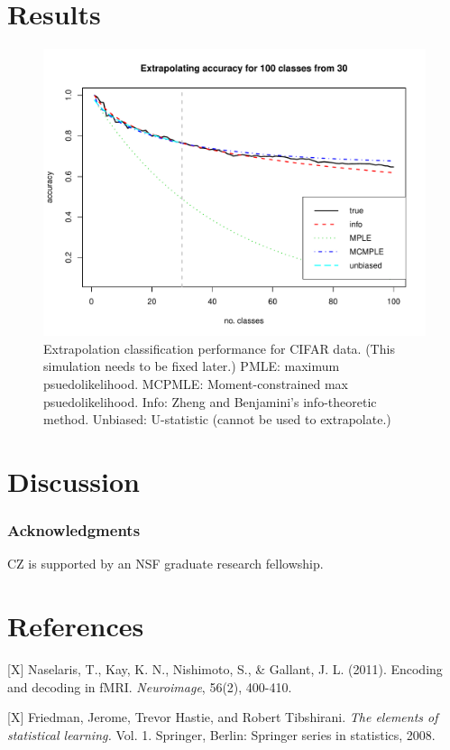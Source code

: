 \documentclass{article}
\begin{document}
\section{Results}

\begin{figure}
\centering
\includegraphics[scale = 0.6]{cifar_example.pdf}
\caption{Extrapolation classification performance for CIFAR data.  (This simulation needs to be fixed later.)
PMLE: maximum psuedolikelihood. MCPMLE: Moment-constrained max psuedolikelihood.  Info: Zheng and Benjamini's info-theoretic method.
Unbiased: U-statistic (cannot be used to extrapolate.) }
\end{figure}

\section{Discussion}


\subsubsection*{Acknowledgments}

CZ is supported by an NSF graduate research fellowship.

\section*{References}

\small

[X] Naselaris, T., Kay, K. N., Nishimoto, S., \& Gallant,
J. L. (2011). Encoding and decoding in fMRI. \emph{Neuroimage}, 56(2),
400-410.

[X] Friedman, Jerome, Trevor Hastie, and Robert Tibshirani. \emph{The elements
of statistical learning.} Vol. 1. Springer, Berlin: Springer series in
statistics, 2008.
\end{document}
